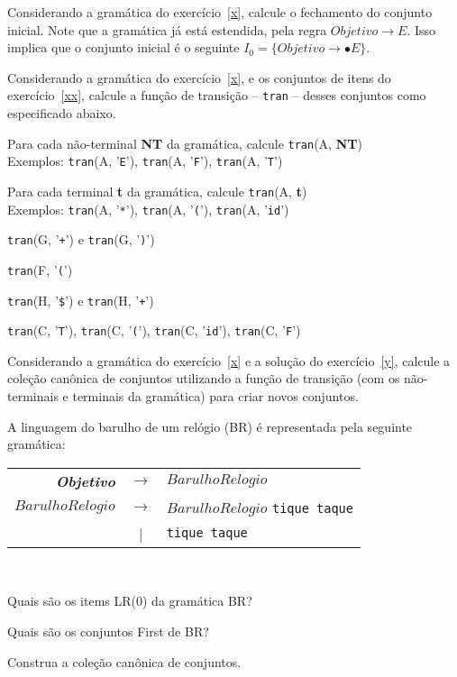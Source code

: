 \documentclass{compiladores}
\begin{document}
\begin{listanumerada}
\item \label{y} Considerando a gramática do exercício~\ref{x}, calcule
  o fechamento do conjunto inicial.  Note que a gramática já está
  estendida, pela regra $Objetivo \rightarrow E$. Isso implica que o
  conjunto inicial é o seguinte $I_0 = \{ Objetivo \rightarrow \bullet
  E \}$.

\item Considerando a gramática do exercício~\ref{x}, e os conjuntos de
  itens do exercício~\ref{xx}, calcule a função de transição --
  \texttt{tran} -- desses conjuntos como especificado abaixo.
  \begin{lista}
    \item Para cada não-terminal {\bf NT} da gramática, calcule \texttt{tran}(A, {\bf NT}) \\
      Exemplos: \texttt{tran}(A, '\texttt{E}'), \texttt{tran}(A, '\texttt{F}'), \texttt{tran}(A, '\texttt{T}')
    \item Para cada terminal {\bf t} da gramática, calcule \texttt{tran}(A, {\bf t}) \\
      Exemplos: \texttt{tran}(A, '\texttt{*}'), \texttt{tran}(A, '\texttt{(}'),  \texttt{tran}(A, '\texttt{id}')
    \item \texttt{tran}(G, '\texttt{+}') e \texttt{tran}(G, '\texttt{)}')
    \item \texttt{tran}(F, '\texttt{(}')
    \item \texttt{tran}(H, '\texttt{\$}') e \texttt{tran}(H, '\texttt{+}')
    \item \texttt{tran}(C, '\texttt{T}'), \texttt{tran}(C, '\texttt{(}'), \texttt{tran}(C, '\texttt{id}'), \texttt{tran}(C, '\texttt{F}')
  \end{lista}

\item Considerando a gramática do exercício~\ref{x} e a solução do
  exercício~\ref{y}, calcule a coleção canônica de conjuntos
  utilizando a função de transição (com os não-terminais e terminais
  da gramática) para criar novos conjuntos.

\item \label{br} A linguagem do barulho de um relógio (BR) é representada pela
  seguinte gramática: \\
     \begin{tabular}{rcl}
     {\bf \emph{Objetivo}} & $\rightarrow$ & $BarulhoRelogio$ \\
     $BarulhoRelogio$ & $\rightarrow$ & $BarulhoRelogio$ \texttt{tique taque} \\
     & | & \texttt{tique taque} \\
     \end{tabular} \\
     \begin{lista}
       \item Quais são os items LR(0) da gramática BR?
       \item Quais são os conjuntos First de BR?
       \item Construa a coleção canônica de conjuntos.
     \end{lista}


\end{listanumerada}
\end{document}
